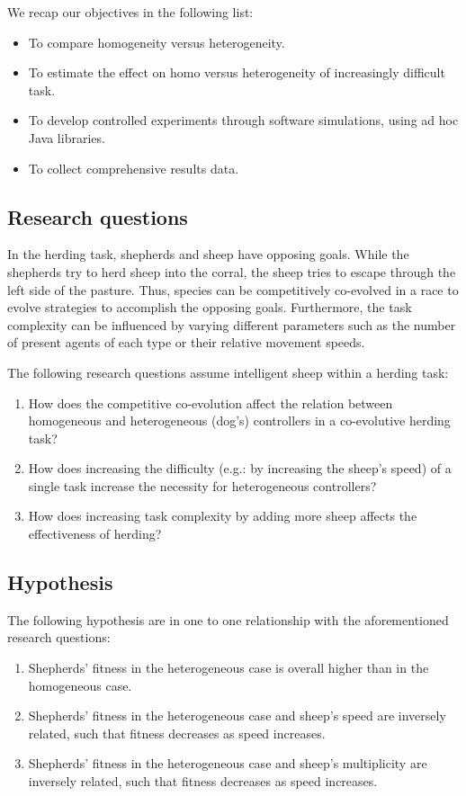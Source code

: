 \documentclass[conference]{IEEEtran}
\begin{document}
We recap our objectives in the following list:

\begin{itemize}
	\item To compare homogeneity versus heterogeneity.
	\item To estimate the effect on homo versus heterogeneity of increasingly difficult task.
 	\item To develop controlled experiments through software simulations, using ad hoc Java libraries.
	\item To collect comprehensive results data.
\end{itemize}
 
\subsection{Research questions}
In the herding task, shepherds and sheep have opposing goals.
While the shepherds try to herd sheep into the corral, the sheep tries to escape through the left side of the pasture.
Thus, species can be competitively co-evolved in a race to evolve strategies to accomplish the opposing goals.
Furthermore, the task complexity can be influenced by varying different parameters such as the number of present agents of each type or their relative movement speeds.

The following research questions assume intelligent sheep within a herding task:
 
\begin{enumerate}
	\item How does the competitive co-evolution affect the relation between homogeneous and heterogeneous (dog’s) controllers in a co-evolutive herding task?
	\item How does increasing the difficulty (e.g.: by increasing the sheep’s speed) of a single task increase the necessity for heterogeneous controllers?
	\item How does increasing task complexity by adding more sheep affects the effectiveness of herding?
\end{enumerate}

\subsection{Hypothesis}
\label{sec:hypothesis}
The following hypothesis are in one to one relationship with the aforementioned research questions:

\begin{enumerate}
	\item Shepherds’ fitness in the heterogeneous case is overall higher than in the homogeneous case.
	\item Shepherds’ fitness in the heterogeneous case and sheep’s speed are inversely related, such that fitness decreases as speed increases.
	\item Shepherds’ fitness in the heterogeneous case and sheep’s multiplicity are inversely related, such that fitness decreases as speed increases.
\end{enumerate}
\end{document}
